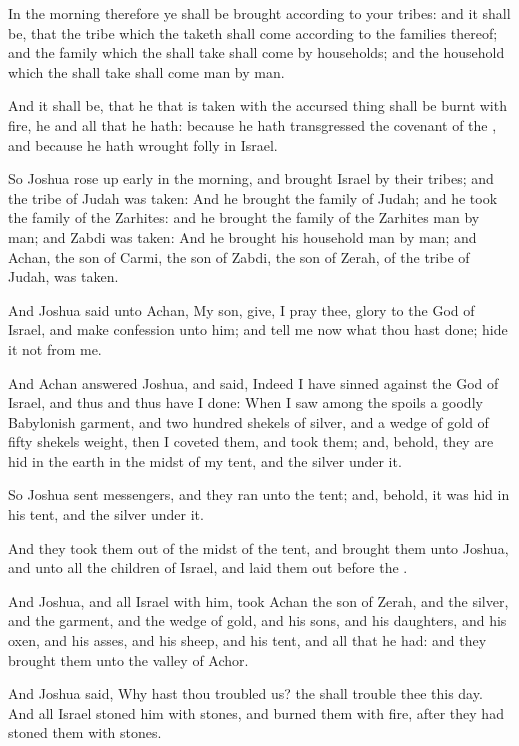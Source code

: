 \verse In the morning therefore ye shall be brought according to your tribes: and it shall be, that the tribe which the \LORD taketh shall come according to the families thereof; and the family which the \LORD shall take shall come by households; and the household which the \LORD shall take shall come man by man.

\verse And it shall be, that he that is taken with the accursed thing shall be burnt with fire, he and all that he hath: because he hath transgressed the covenant of the \LORD, and because he hath wrought folly in Israel.

\verse So Joshua rose up early in the morning, and brought Israel by their tribes; and the tribe of Judah was taken: \verse And he brought the family of Judah; and he took the family of the Zarhites: and he brought the family of the Zarhites man by man; and Zabdi was taken: \verse And he brought his household man by man; and Achan, the son of Carmi, the son of Zabdi, the son of Zerah, of the tribe of Judah, was taken.

\verse And Joshua said unto Achan, My son, give, I pray thee, glory to the \LORD God of Israel, and make confession unto him; and tell me now what thou hast done; hide it not from me.

\verse And Achan answered Joshua, and said, Indeed I have sinned against the \LORD God of Israel, and thus and thus have I done: \verse When I saw among the spoils a goodly Babylonish garment, and two hundred shekels of silver, and a wedge of gold of fifty shekels weight, then I coveted them, and took them; and, behold, they are hid in the earth in the midst of my tent, and the silver under it.

\verse So Joshua sent messengers, and they ran unto the tent; and, behold, it was hid in his tent, and the silver under it.

\verse And they took them out of the midst of the tent, and brought them unto Joshua, and unto all the children of Israel, and laid them out before the \LORD.

\verse And Joshua, and all Israel with him, took Achan the son of Zerah, and the silver, and the garment, and the wedge of gold, and his sons, and his daughters, and his oxen, and his asses, and his sheep, and his tent, and all that he had: and they brought them unto the valley of Achor.

\verse And Joshua said, Why hast thou troubled us? the \LORD shall trouble thee this day. And all Israel stoned him with stones, and burned them with fire, after they had stoned them with stones.

